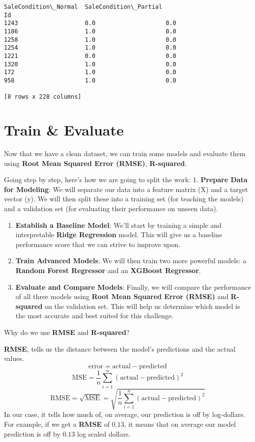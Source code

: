 \documentclass[11pt]{article}
\begin{document}
\begin{tcolorbox}[breakable, size=fbox, boxrule=.5pt, pad at break*=1mm, opacityfill=0]
\begin{Verbatim}[commandchars=\\\{\}]
      SaleCondition\_Normal  SaleCondition\_Partial
Id
1243                   0.0                    0.0
1186                   1.0                    0.0
1258                   1.0                    0.0
1254                   1.0                    0.0
1221                   0.0                    0.0
1320                   1.0                    0.0
172                    1.0                    0.0
958                    1.0                    0.0

[8 rows x 228 columns]
\end{Verbatim}
\end{tcolorbox}
        
    \section{Train \& Evaluate}\label{train-evaluate}

    Now that we have a clean dataset, we can train some models and evaluate
them using \textbf{Root Mean Squared Error (RMSE)}, \textbf{R-squared}.

Going step by step, here's how we are going to split the work: 1.
\textbf{Prepare Data for Modeling}: We will separate our data into a
feature matrix (X) and a target vector (y). We will then split these
into a training set (for teaching the models) and a validation set (for
evaluating their performance on unseen data).

\begin{enumerate}
\def\labelenumi{\arabic{enumi}.}
\setcounter{enumi}{1}
\item
  \textbf{Establish a Baseline Model}: We'll start by training a simple
  and interpretable \textbf{Ridge Regression} model. This will give us a
  baseline performance score that we can strive to improve upon.
\item
  \textbf{Train Advanced Models}: We will then train two more powerful
  models: a \textbf{Random Forest Regressor} and an \textbf{XGBoost
  Regressor}.
\item
  \textbf{Evaluate and Compare Models}: Finally, we will compare the
  performance of all three models using \textbf{Root Mean Squared Error
  (RMSE)} and \textbf{R-squared} on the validation set. This will help
  us determine which model is the most accurate and best suited for this
  challenge.
\end{enumerate}

Why do we use \textbf{RMSE} and \textbf{R-squared}?

\textbf{RMSE}, tells us the distance between the model's predictions and
the actual values. \[\mathrm{error}=\mathrm{actual}-\mathrm{predicted}\]
\[\mathrm{MSE}=\frac{1}{n}\sum_{i=1}^{n}(\mathrm{actual}-\mathrm{predicted})^2\]
\[\mathrm{RMSE}=\sqrt{\mathrm{MSE}}=\sqrt{\frac{1}{n}\sum_{i=1}^{n}(\mathrm{actual}-\mathrm{predicted})^2}\]
In our case, it tells how much of, on average, our prediction is off by
log-dollars. For example, if we get a \textbf{RMSE} of \(0.13\), it
means that on average our model prediction is off by \(0.13\) log scaled
dollars.
\end{document}
